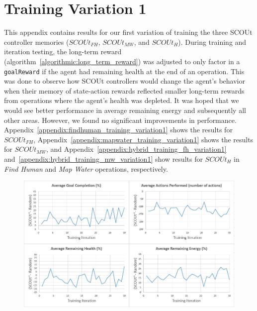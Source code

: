 \pagebreak
\tocless\section{Training Variation 1} \label{sec:training_variation1}
This appendix contains results for our first variation of training the three SCOUt controller memories ($SCOUt_{FH}$, $SCOUt_{MW}$, and $SCOUt_{H}$).
During training and iteration testing, the long-term reward (algorithm~\ref{algorithmic:long_term_reward}) was adjusted to only factor in a \texttt{goalReward} if the agent had remaining health at the end of an operation.
This was done to observe how SCOUt controllers would change the agent's behavior when their memory of state-action rewards reflected smaller long-term rewards from operations where the agent's health was depleted.
It was hoped that we would see better performance in average remaining energy and subsequently all other areas.
However, we found no significant improvements in performance.
Appendix~\ref{appendix:findhuman_training_variation1} shows the results for $SCOUt_{FH}$, Appendix~\ref{appendix:mapwater_training_variation1} shows the results for $SCOUt_{MW}$, and Appendix~\ref{appendix:hybrid_training_fh_variation1} and~\ref{appendix:hybrid_training_mw_variation1} show results for $SCOUt_{H}$ in \textit{Find Human} and \textit{Map Water} operations, respectively.

\begin{appxfig}[H]
\begin{figure}[H]
  \centering
  \includegraphics[width=0.9\columnwidth]{Figures/Results/TrainingVariation1/FindHuman.JPG}
\end{figure}
\caption{Iteration testing performance results for $SCOUt_{FH}$ attempting \textit{Find Human} using setup variation 1 (see subsection~\ref{subsec:training_variations}). All graphs show the controller's average difference in performance compared to $Random$ ($SCOUt_{FH}$ average - $Random$ average) VS the number of training iterations completed.}
\label{appendix:findhuman_training_variation1}
\end{appxfig}


